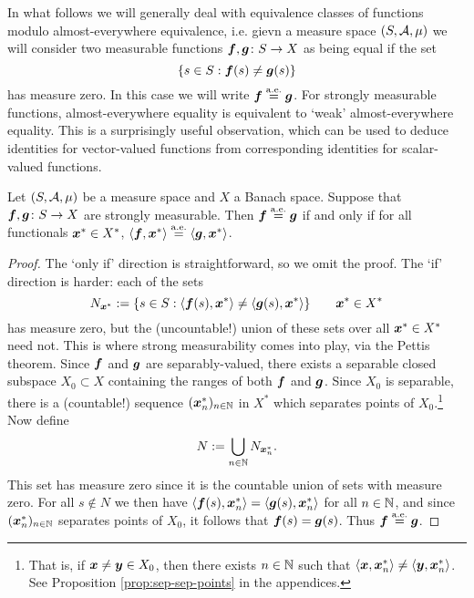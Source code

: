 In what follows we will generally deal with equivalence classes of functions modulo almost-everywhere equivalence, i.e. gievn a measure space $(S,\mathcal{A},\mu)$ we will consider two measurable functions $\bm{f},\bm{g} \colon S \rightarrow X$ as being equal if the set
\begin{equation*}
  \{s \in S : \bm{f}(s) \neq \bm{g}(s)\}
\end{equation*}
has measure zero.
In this case we will write $\bm{f} \stackrel{\mathrm{a.e.}}{=} \bm{g}$.
For strongly measurable functions, almost-everywhere equality is equivalent to `weak' almost-everywhere equality.
This is a surprisingly useful observation, which can be used to deduce identities for vector-valued functions from corresponding identities for scalar-valued functions.

\begin{lem}\label{lem:coordinatewise-equality-test}
  Let $(S,\mathcal{A},\mu)$ be a measure space and $X$ a Banach space.
  Suppose that $\bm{f},\bm{g} \colon S \rightarrow X$ are strongly measurable.
  Then $\bm{f} \stackrel{\mathrm{a.e.}}{=} \bm{g}$ if and only if for all functionals $\bm{x}^* \in X^*$, $\langle \bm{f}, \bm{x}^*\rangle \stackrel{\mathrm{a.e.}}{=} \langle \bm{g}, \bm{x}^* \rangle$.
\end{lem}

\begin{proof}
  The `only if' direction is straightforward, so we omit the proof.
  The `if' direction is harder: each of the sets
  \begin{equation*}
    N_{\bm{x}^*} := \{s \in S : \langle \bm{f}(s), \bm{x}^* \rangle \neq \langle \bm{g}(s), \bm{x}^* \rangle\} \qquad \bm{x}^* \in X^*
  \end{equation*}
  has measure zero, but the (uncountable!) union of these sets over all $\bm{x}^* \in X^*$ need not.
  This is where strong measurability comes into play, via the Pettis theorem.
  Since $\bm{f}$ and $\bm{g}$ are separably-valued, there exists a separable closed subspace $X_0 \subset X$ containing the ranges of both $\bm{f}$ and $\bm{g}$.
  Since $X_0$ is separable, there is a (countable!) sequence $(\bm{x}_n^*)_{n \in \mathbb{N}}$ in $X^*$ which separates points of $X_0$.\footnote{That is, if $\bm{x} \neq \bm{y} \in X_0$, then there exists $n \in \mathbb{N}$ such that $\langle \bm{x}, \bm{x}_n^* \rangle \neq \langle \bm{y}, \bm{x}_n^* \rangle$. See Proposition \ref{prop:sep-sep-points} in the appendices.}
  Now define
  \begin{equation*}
    N := \bigcup_{n \in \mathbb{N}} N_{\bm{x}_n^*}.
  \end{equation*}
  This set has measure zero since it is the countable union of sets with measure zero.
  For all $s \notin N$ we then have $\langle \bm{f}(s), \bm{x}_n^* \rangle = \langle \bm{g}(s), \bm{x}_n^* \rangle$ for all $n \in \mathbb{N}$, and since $(\bm{x}_n^*)_{n \in \mathbb{N}}$ separates points of $X_0$, it follows that $\bm{f}(s) = \bm{g}(s)$.
  Thus $\bm{f} \stackrel{\mathrm{a.e.}}{=} \bm{g}$.  
\end{proof}

